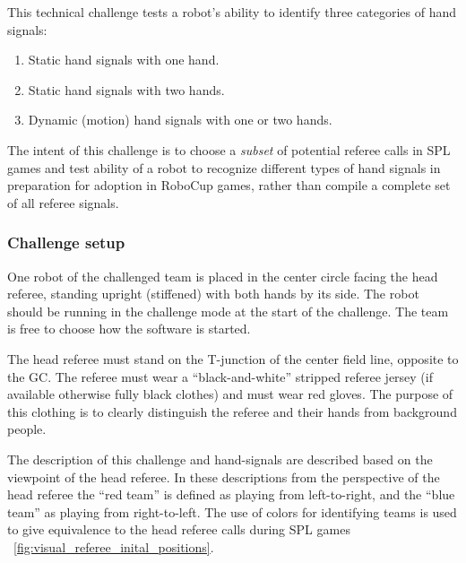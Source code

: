        This technical challenge tests a robot's ability to identify three categories of hand signals:
        \begin{enumerate}
            \item Static hand signals with one hand.
            \item Static hand signals with two hands.
            \item Dynamic (motion) hand signals with one or two hands.
        \end{enumerate}
        
        The intent of this challenge is to choose a \emph{subset} of potential referee calls in SPL games and test ability of a robot to recognize different types of hand signals in preparation for adoption in RoboCup games, rather than compile a complete set of all referee signals.

    \subsubsection{Challenge setup}

        One robot of the challenged team is placed in the center circle facing the head referee, standing upright (stiffened) with both hands by its side. The robot should be running in the challenge mode at the start of the challenge. The team is free to choose how the software is started.
        
        The head referee must stand on the T-junction of the center field line, opposite to the GC. The referee must wear a ``black-and-white'' stripped referee jersey (if available otherwise fully black clothes) and must wear red gloves. The purpose of this clothing is to clearly distinguish the referee and their hands from background people. 
        
        The description of this challenge and hand-signals are described based on the viewpoint of the head referee. In these descriptions from the perspective of the head referee the ``red team'' is defined as playing from left-to-right, and the ``blue team'' as playing from right-to-left. The use of colors for identifying teams is used to give equivalence to the head referee calls during SPL games \cf~\cref{fig:visual_referee_inital_positions}.

